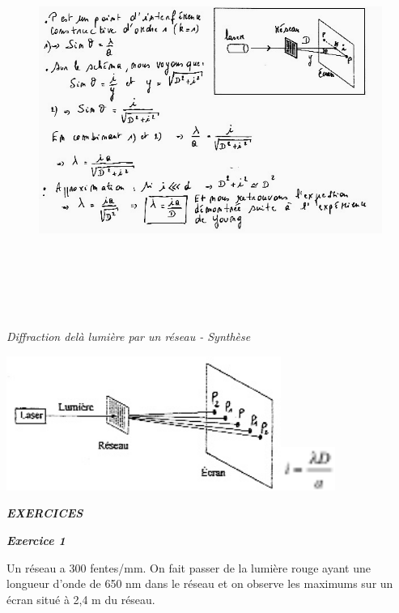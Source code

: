 \begin{figure}
\centering
\includegraphics[width=19.177cm,height=12.658cm]{Pictures/10000001000002580000018C86EAAA8910282BD9.png}
\caption{}
\end{figure}

\emph{Diffraction delà lumière par un réseau - Synthèse}

\includegraphics[width=8.976cm,height=4.397cm]{Pictures/100000010000010800000081DE709BA3D328A388.png}\includegraphics[width=1.757cm,height=1.432cm]{Pictures/100000010000001A0000001535F2FEA5DABE5CC8.png}

\emph{\textbf{EXERCICES}}

\emph{\textbf{Exercice 1}}

Un réseau a 300 fentes/mm. On fait passer de la lumière rouge ayant une
longueur d'onde de 650 nm dans le réseau et on observe les maximums sur
un écran situé à 2,4 m du réseau.

